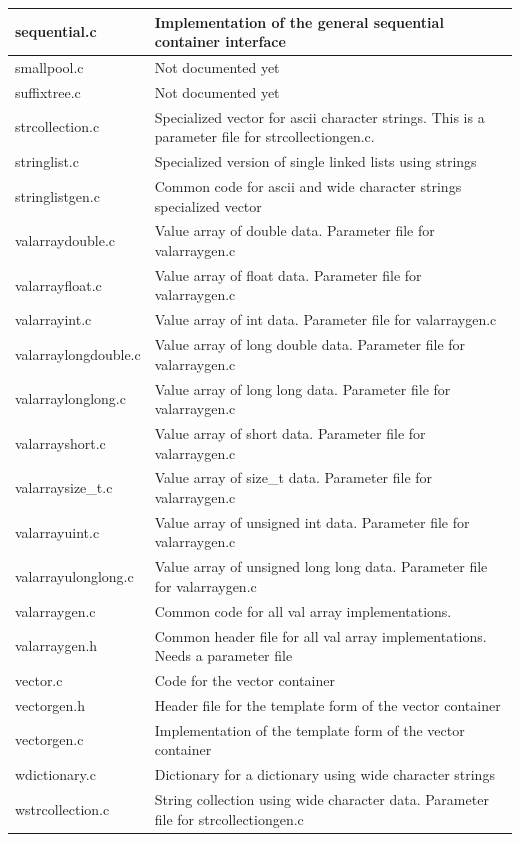 \documentclass[12pt,a4paper]{memoir} %
\begin{document}
{{{\begin{longtable}{||p{3.5cm}|p{11cm}||}
sequential.c&Implementation of the general sequential container interface\\\hline
smallpool.c&Not documented yet\\\hline
suffixtree.c&Not documented yet\\\hline
strcollection.c&Specialized vector for ascii character strings. This is a parameter file for strcollectiongen.c.\\\hline
stringlist.c&Specialized version of single linked lists using strings\\\hline
stringlistgen.c&Common code for ascii and wide character strings specialized vector\\\hline
valarraydouble.c&Value array of double data. Parameter file for valarraygen.c\\\hline
valarrayfloat.c&Value array of float data. Parameter file for valarraygen.c\\\hline
valarrayint.c&Value array of int data. Parameter file for valarraygen.c\\\hline
valarraylongdouble.c&Value array of long double data. Parameter file for valarraygen.c\\\hline
valarraylonglong.c&Value array of long long data. Parameter file for valarraygen.c\\\hline
valarrayshort.c&Value array of short data. Parameter file for valarraygen.c\\\hline
valarraysize\_t.c&Value array of size\_t data. Parameter file for valarraygen.c\\\hline
valarrayuint.c&Value array of unsigned int data. Parameter file for valarraygen.c\\\hline
valarrayulonglong.c&Value array of unsigned long long data. Parameter file for valarraygen.c\\\hline
valarraygen.c&Common code for all val array implementations.\\\hline
valarraygen.h&Common header file for all val array implementations. Needs a parameter file\\\hline
vector.c&Code for the vector container\\\hline
vectorgen.h&Header file for the template form of the vector container\\\hline
vectorgen.c&Implementation of the template form of the vector container\\\hline
wdictionary.c&Dictionary for a dictionary using wide character strings\\\hline
wstrcollection.c&String collection using wide character data. Parameter file for strcollectiongen.c\\\hline \hline
\end{longtable}

}}}
\end{document}
